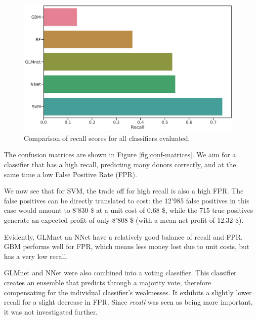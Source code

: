 \documentclass[
  11pt,
  a4paper,
  DIV=12,captions=tableheading,oneside,titlepage]{scrbook}
\begin{document}
\begin{figure}

{\centering \includegraphics[width=0.7\linewidth]{figures/learning/recall-scores} 

}

\caption{Comparison of recall scores for all classifiers evaluated.}\label{fig:recall-scores}
\end{figure}

The confusion matrices are shown in Figure \ref{fig:conf-matrices}. We aim for a classifier that has a high recall, predicting many donors correctly, and at the same time a low False Positive Rate (FPR).

We now see that for SVM, the trade off for high recall is also a high FPR. The false positives can be directly translated to cost: the 12'985 false positives in this case would amount to 8'830 \$ at a unit cost of 0.68 \$, while the 715 true positives generate an expected profit of only 8'808 \$ (with a mean net profit of 12.32 \$).

Evidently, GLMnet an NNet have a relatively good balance of recall and FPR. GBM performs well for FPR, which means less money lost due to unit costs, but has a very low recall.

GLMnet and NNet were also combined into a voting classifier. This classifier creates an ensemble that predicts through a majority vote, therefore compensating for the individual classifier's weaknesses. It exhibits a slightly lower recall for a slight decrease in FPR. Since \emph{recall} was seen as being more important, it was not investigated further.
\end{document}
